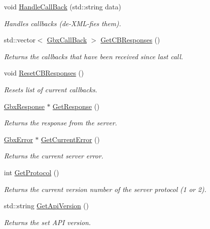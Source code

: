 \begin{DoxyCompactItemize}
void \hyperlink{classGbxRemote_a5bd6e1dc2118f7e369e72592b3c9322a}{Handle\-Call\-Back} (std\-::string data)
\begin{DoxyCompactList}\small\item\em Handles callbacks (de-\/\-X\-M\-L-\/fies them). \end{DoxyCompactList}\item 
std\-::vector$<$ \hyperlink{classGbxCallBack}{Gbx\-Call\-Back} $>$ \hyperlink{classGbxRemote_a1ae6ff7eddcccdeda59af2316d053aae}{Get\-C\-B\-Responses} ()
\begin{DoxyCompactList}\small\item\em Returns the callbacks that have been received since last call. \end{DoxyCompactList}\item 
void \hyperlink{classGbxRemote_a81ba62f042948610a3cf720316e22076}{Reset\-C\-B\-Responses} ()
\begin{DoxyCompactList}\small\item\em Resets list of current callbacks. \end{DoxyCompactList}\item 
\hyperlink{classGbxResponse}{Gbx\-Response} $\ast$ \hyperlink{classGbxRemote_adac67444e391ffcc1dfda8f087eaef0b}{Get\-Response} ()
\begin{DoxyCompactList}\small\item\em Returns the response from the server. \end{DoxyCompactList}\item 
\hyperlink{structGbxError}{Gbx\-Error} $\ast$ \hyperlink{classGbxRemote_a5467b5400129cd13239f88576aaaa2b4}{Get\-Current\-Error} ()
\begin{DoxyCompactList}\small\item\em Returns the current server error. \end{DoxyCompactList}\item 
int \hyperlink{classGbxRemote_ae6e15060920a31482fd14045cfd42803}{Get\-Protocol} ()
\begin{DoxyCompactList}\small\item\em Returns the current version number of the server protocol (1 or 2). \end{DoxyCompactList}\item 
std\-::string \hyperlink{classGbxRemote_a6351f71fe649bff2aabfbd9b7c89e3f5}{Get\-Api\-Version} ()
\begin{DoxyCompactList}\small\item\em Returns the set A\-P\-I version. \end{DoxyCompactList}\end{DoxyCompactItemize}
